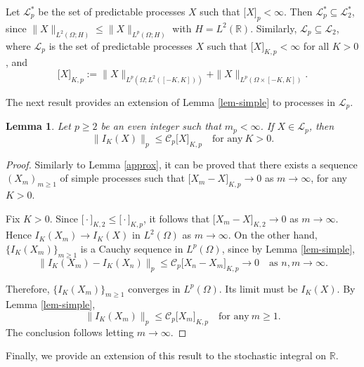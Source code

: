 \documentclass[12pt]{article}
\newtheorem{lemma}[theorem]{Lemma}
\def\cC{\mathcal{C}}
\def\cL{\mathcal{L}}
\def\bR{\mathbb{R}}
\begin{document}
Let $\cL_p^*$ be the set of predictable processes $X$ such that $\big[X \big]_p<\infty$. Then $\cL_p^* \subseteq \cL_2^*$, since $\|X\|_{L^2(\Omega;H)} \leq \|X\|_{L^p(\Omega;H)}$ with $H=L^2(\bR)$.
Similarly, $\cL_p \subseteq \cL_2$, where $\cL_p$ is the set of predictable processes $X$ such that $\big[ X \big]_{K,p}<\infty$ for all $K>0$, and
\[
\big[X\big]_{K,p}:=\|X\|_{L^p(\Omega;L^2([-K,K]))}+\|X\|_{L^p(\Omega \times [-K,K])}.
\]



The next result provides an extension of Lemma \ref{lem-simple} to processes in $\cL_p$.

\begin{lemma}
\label{lem-simple-p}
Let $p \geq 2$ be an even integer such that $m_p<\infty$. If $X \in \cL_p$, then
\begin{equation}
\label{p-mom-X}
\|I_K(X)\|_p \leq \cC_p \big[ X\big]_{K,p} \quad \mbox{for any} \ K>0.
\end{equation}
\end{lemma}

\begin{proof}
Similarly to Lemma \ref{approx}, it can be proved that there exists a sequence $(X_m)_{m\geq 1}$ of simple processes such that $\big[X_m-X \big]_{K,p} \to 0$ as $m \to \infty$, for any $K>0$. 

Fix $K>0$. Since $\big[\cdot \big]_{K,2} \leq \big[ \cdot \big]_{K,p}$, it follows that
$\big[X_m-X \big]_{K,2} \to 0$ as $m \to \infty$. Hence $I_K(X_m) \to I_K(X)$ in $L^2(\Omega)$ as $m \to \infty$. On the other hand, $\{I_K(X_m)\}_{m\geq 1}$ is a Cauchy sequence in $L^p(\Omega)$, since by Lemma \ref{lem-simple}, 
\[
\|I_K(X_m)-I_K(X_n)\|_p \leq \cC_p \big[X_n-X_m \big]_{K,p} \to 0 \quad \mbox{as $n,m \to \infty$}.
\]

Therefore, $\{I_K(X_m)\}_{m\geq 1}$ converges in $L^p(\Omega)$. Its limit must be $I_K(X)$. By Lemma \ref{lem-simple},
\[
\|I_K(X_m)\|_p \leq \cC_p \big[ X_m \big]_{K,p} \quad \mbox{for any} \ m\geq 1.
\] 
The conclusion follows letting $m \to \infty$.
\end{proof}

Finally, we provide an extension of this result to the stochastic integral on $\bR$.
\end{document}
